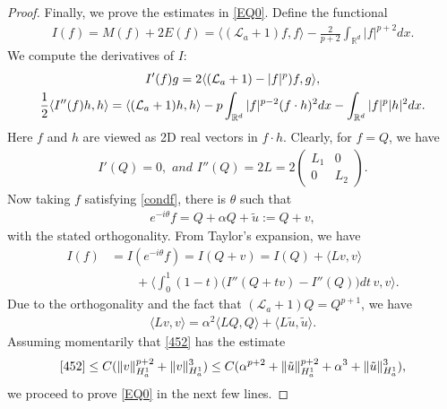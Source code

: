 \documentclass[12pt]{amsart}
\newcommand{\R}{\mathbb R}
\newcommand{\la}{\mathcal L_a}
\newcommand{\nha}{H^1_a}
\begin{document}
\begin{proof}
Finally, we prove the estimates in \eqref{EQ0}. Define the functional 
\begin{align*}
I(f)=M(f)+2E(f)=\langle(\la+1)f, f\rangle-\frac 2{p+2}\int_{\R^d} |f|^{p+2}dx.
\end{align*}
We compute the derivatives of $I$: 
\begin{gather}
I'(f) g=2\langle(\la+1)-|f|^p) f, g\rangle,\notag\\
\frac 12\langle I''(f)h, h\rangle =\langle(\la+1)h, h\rangle-p\int_{\R^d}|f|^{p-2}(f\cdot h)^2dx -\int_{\R^d}|f|^p|h|^2 dx. \label{1134}
\end{gather}
Here $f$ and $h$ are viewed as 2D real vectors in $f\cdot h$.
Clearly, for $f=Q$, we have 
\begin{align}\label{1133}
I'(Q)=0, \textit{ and } I''(Q)=2L =2\begin{pmatrix}L_1&0\\0&L_2\end{pmatrix}. 
\end{align}
Now taking $f$ satisfying \eqref{condf}, there is $\theta$ such that
\begin{align*}
e^{-i\theta}f=Q+\alpha Q+\tilde u:=Q+v,
\end{align*}
with the stated orthogonality. From Taylor's expansion, we have 
\begin{align}
I(f)&=I(e^{-i\theta} f)=I(Q+v)=I(Q)+\langle L v, v\rangle 
\label{451}\\&\qquad 
+\langle \int_0^1 (1-t)\bigl (I''(Q+tv)-I''(Q)\bigr) dt \, v, v\rangle. \label{452}
\end{align}
Due to the orthogonality and the fact that $(\la+ 1)Q = Q^{p+1}$, we have
\begin{align}\label{453}
\langle Lv, v\rangle=\alpha^2\langle LQ, Q\rangle +\langle L\tilde  u, \tilde u\rangle. 
\end{align}
 Assuming momentarily that \eqref{452} has the estimate 
 \begin{align}
 \eqref{452}\le C(\|v\|_{\nha}^{p+2}+\|v\|_{\nha}^3)\le C(\alpha^{p+2}+\|\tilde u\|_{\nha}^{p+2}+\alpha^3+\|\tilde u\|_{\nha}^3), \label{454}
 \end{align}
 we proceed to prove \eqref{EQ0} in the next few lines. 
 

\end{proof}
\end{document}
